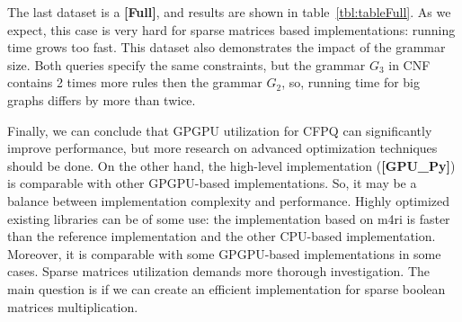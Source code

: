 The last dataset is a \textbf{[Full]}, and results are shown in table~\ref{tbl:tableFull}.
As we expect, this case is very hard for sparse matrices based implementations: running time grows too fast.
This dataset also demonstrates the impact of the grammar size.
Both queries specify the same constraints, but the grammar $G_3$ in CNF contains 2 times more rules then the grammar $G_2$, so, running time for big graphs differs by more than twice.

Finally, we can conclude that GPGPU utilization for CFPQ can significantly improve performance, but more research on advanced optimization techniques should be done.
On the other hand, the high-level implementation (\textbf{[GPU\_Py]}) is comparable with other GPGPU-based implementations.
So, it may be a balance between implementation complexity and performance.
Highly optimized existing libraries can be of some use: the implementation based on m4ri is faster than the reference implementation and the other CPU-based implementation.
Moreover, it is comparable with some GPGPU-based implementations in some cases.
Sparse matrices utilization demands more thorough investigation.
The main question is if we can create an efficient implementation for sparse boolean matrices multiplication.
